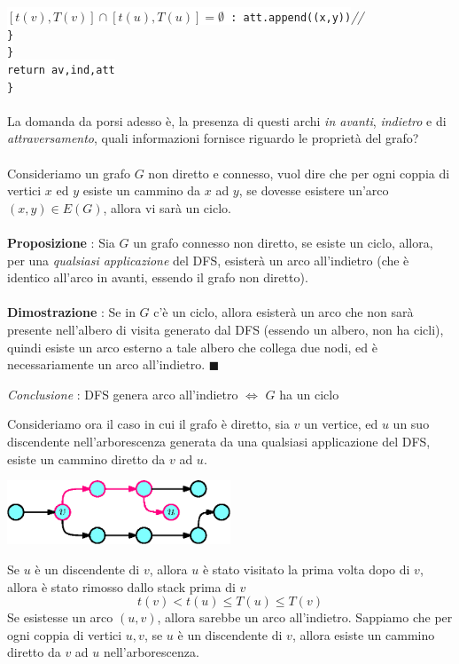 \documentclass[12pt, letterpaper]{article}
\newcommand{\codee}[1]{\colorbox{white}{\texttt{#1}}}
\newcommand{\acc}{\\\hphantom{}\\}
\newcommand{\comm}[1]{\color{lg}\textit{\hphantom{spaz}// \text{#1}}\color{black}}
\begin{document}
\hphantom{ident}\hphantom{ident}\hphantom{ident}\codee{$[t(v),T(v)]\cap[t(u),T(u)]=\emptyset$ : att.append((x,y))}\comm{si ricade nel terzo caso}\\
\hphantom{ident}\hphantom{ident}\codee{\}}\\
\hphantom{ident}\codee{\}}\\
\hphantom{ident}\codee{return av,ind,att}\\
\codee{\}}\acc 
La domanda da porsi adesso è, la presenza di questi archi \textit{in avanti}, \textit{indietro} e di \textit{attraversamento}, 
quali informazioni fornisce riguardo le proprietà del grafo?\acc Consideriamo un grafo \(G\) non diretto e connesso, vuol dire che per 
ogni coppia di vertici \(x\) ed $y$ esiste un cammino da $x$ ad $y$, se dovesse esistere un'arco \((x,y)\in E(G)\), allora 
vi sarà un ciclo.\acc 
\textbf{Proposizione} : Sia \(G\) un grafo connesso non diretto, se esiste un ciclo, allora, per una
 \textit{qualsiasi applicazione} del DFS, esisterà un arco all'indietro (che è identico all'arco in avanti,
  essendo il grafo non diretto).\acc 
\textbf{Dimostrazione} : Se in \(G\) c'è un ciclo, allora esisterà un arco che non sarà presente nell'albero di visita 
generato dal DFS (essendo un albero, non ha cicli), quindi esiste un arco esterno a tale albero che collega due nodi, 
ed è necessariamente un arco all'indietro. \(\blacksquare\)
\begin{center}
    \textit{Conclusione} : DFS genera arco all'indietro $\iff$ \(G\) ha un ciclo
\end{center}
Consideriamo ora il caso in cui il grafo è diretto, sia \(v\) un vertice, ed \(u\) un suo discendente nell'arborescenza 
generata da una qualsiasi applicazione del DFS, esiste un cammino diretto da \(v\) ad \(u\).\begin{center}
    \includegraphics[width=0.5\textwidth ]{images/discentente.eps}
    \end{center}
Se \(u\) è un discendente di \(v\), allora \(u\) è stato visitato la prima volta dopo di \(v\), allora è stato 
rimosso dallo stack prima di \(v\) $$t(v)<t(u)\le T(u)\le T(v)$$
Se esistesse un arco $(u,v)$, allora sarebbe un arco all'indietro. Sappiamo che per ogni coppia di vertici 
\(u,v\), se \(u\) è un discendente di \(v\), allora esiste un cammino diretto da \(v\) ad \(u\) nell'arborescenza.\acc 
\end{document}
